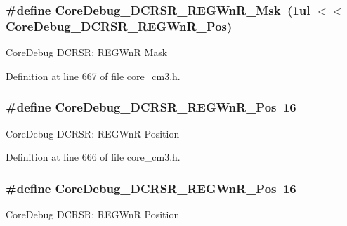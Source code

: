 \subsubsection[{\texorpdfstring{Core\+Debug\+\_\+\+D\+C\+R\+S\+R\+\_\+\+R\+E\+G\+Wn\+R\+\_\+\+Msk}{CoreDebug_DCRSR_REGWnR_Msk}}]{\setlength{\rightskip}{0pt plus 5cm}\#define Core\+Debug\+\_\+\+D\+C\+R\+S\+R\+\_\+\+R\+E\+G\+Wn\+R\+\_\+\+Msk~(1ul $<$$<$ Core\+Debug\+\_\+\+D\+C\+R\+S\+R\+\_\+\+R\+E\+G\+Wn\+R\+\_\+\+Pos)}\hypertarget{group___c_m_s_i_s___c_m3___core_debug_ga1eef4992d8f84bc6c0dffed1c87f90a5}{}\label{group___c_m_s_i_s___c_m3___core_debug_ga1eef4992d8f84bc6c0dffed1c87f90a5}
Core\+Debug D\+C\+R\+SR\+: R\+E\+G\+WnR Mask 

Definition at line 667 of file core\+\_\+cm3.\+h.

\subsubsection[{\texorpdfstring{Core\+Debug\+\_\+\+D\+C\+R\+S\+R\+\_\+\+R\+E\+G\+Wn\+R\+\_\+\+Pos}{CoreDebug_DCRSR_REGWnR_Pos}}]{\setlength{\rightskip}{0pt plus 5cm}\#define Core\+Debug\+\_\+\+D\+C\+R\+S\+R\+\_\+\+R\+E\+G\+Wn\+R\+\_\+\+Pos~16}\hypertarget{group___c_m_s_i_s___c_m3___core_debug_ga51e75942fc0614bc9bb2c0e96fcdda9a}{}\label{group___c_m_s_i_s___c_m3___core_debug_ga51e75942fc0614bc9bb2c0e96fcdda9a}
Core\+Debug D\+C\+R\+SR\+: R\+E\+G\+WnR Position 

Definition at line 666 of file core\+\_\+cm3.\+h.

\subsubsection[{\texorpdfstring{Core\+Debug\+\_\+\+D\+C\+R\+S\+R\+\_\+\+R\+E\+G\+Wn\+R\+\_\+\+Pos}{CoreDebug_DCRSR_REGWnR_Pos}}]{\setlength{\rightskip}{0pt plus 5cm}\#define Core\+Debug\+\_\+\+D\+C\+R\+S\+R\+\_\+\+R\+E\+G\+Wn\+R\+\_\+\+Pos~16}\hypertarget{group___c_m_s_i_s___c_m3___core_debug_ga51e75942fc0614bc9bb2c0e96fcdda9a}{}\label{group___c_m_s_i_s___c_m3___core_debug_ga51e75942fc0614bc9bb2c0e96fcdda9a}
Core\+Debug D\+C\+R\+SR\+: R\+E\+G\+WnR Position 

